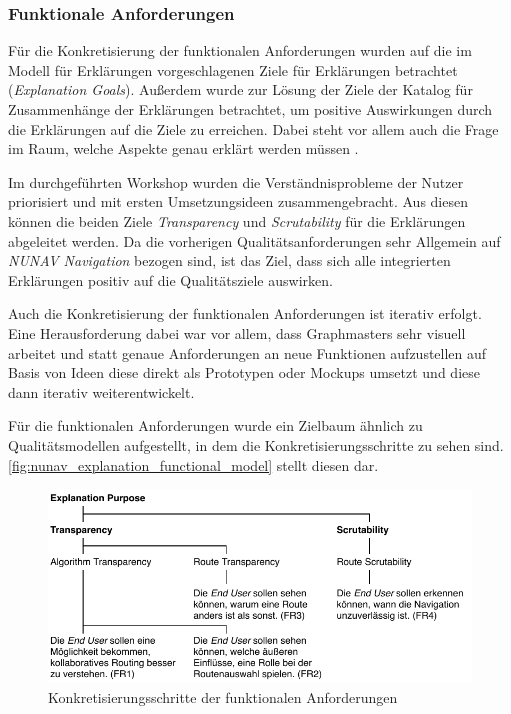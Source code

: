 \subsubsection{Funktionale Anforderungen}

Für die Konkretisierung der funktionalen Anforderungen wurden auf die im Modell für Erklärungen vorgeschlagenen Ziele für Erklärungen betrachtet (\textit{Explanation Goals}). Außerdem wurde zur Lösung der Ziele der Katalog für Zusammenhänge der Erklärungen betrachtet, um positive Auswirkungen durch die Erklärungen auf die Ziele zu erreichen. Dabei steht vor allem auch die Frage im Raum, welche Aspekte genau erklärt werden müssen \cite{kohl_explainability_2019}.

Im durchgeführten Workshop wurden die Verständnisprobleme der Nutzer priorisiert und mit ersten Umsetzungsideen zusammengebracht. Aus diesen können die beiden Ziele \textit{Transparency} und \textit{Scrutability} für die Erklärungen abgeleitet werden. Da die vorherigen Qualitätsanforderungen sehr Allgemein auf \textit{NUNAV Navigation} bezogen sind, ist das Ziel, dass sich alle integrierten Erklärungen positiv auf die Qualitätsziele auswirken.

Auch die Konkretisierung der funktionalen Anforderungen ist iterativ erfolgt. Eine Herausforderung dabei war vor allem, dass Graphmasters sehr visuell arbeitet und statt genaue Anforderungen an neue Funktionen aufzustellen auf Basis von Ideen diese direkt als Prototypen oder Mockups umsetzt und diese dann iterativ weiterentwickelt.

Für die funktionalen Anforderungen wurde ein Zielbaum ähnlich zu Qualitätsmodellen aufgestellt, in dem die Konkretisierungsschritte zu sehen sind. \autoref{fig:nunav_explanation_functional_model} stellt diesen dar.

\begin{figure}[htb!]
    \centering
    \includegraphics[]{contents/06_model_evaluation/01_integration/res/functional_model.pdf}
    \caption{Konkretisierungsschritte der funktionalen Anforderungen}
    \label{fig:nunav_explanation_functional_model}
\end{figure}

